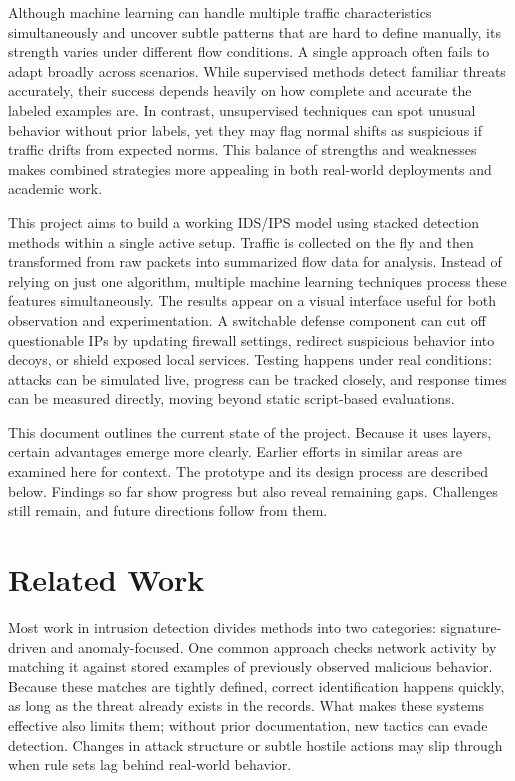 \documentclass[conference]{IEEEtran}
\begin{document}
Although machine learning can handle multiple traffic characteristics simultaneously and uncover subtle patterns that are hard to define manually, its strength varies under different flow conditions. A single approach often fails to adapt broadly across scenarios. While supervised methods detect familiar threats accurately, their success depends heavily on how complete and accurate the labeled examples are. In contrast, unsupervised techniques can spot unusual behavior without prior labels, yet they may flag normal shifts as suspicious if traffic drifts from expected norms. This balance of strengths and weaknesses makes combined strategies more appealing in both real-world deployments and academic work.

This project aims to build a working IDS/IPS model using stacked detection methods within a single active setup. Traffic is collected on the fly and then transformed from raw packets into summarized flow data for analysis. Instead of relying on just one algorithm, multiple machine learning techniques process these features simultaneously. The results appear on a visual interface useful for both observation and experimentation. A switchable defense component can cut off questionable IPs by updating firewall settings, redirect suspicious behavior into decoys, or shield exposed local services. Testing happens under real conditions: attacks can be simulated live, progress can be tracked closely, and response times can be measured directly, moving beyond static script-based evaluations.

This document outlines the current state of the project. Because it uses layers, certain advantages emerge more clearly. Earlier efforts in similar areas are examined here for context. The prototype and its design process are described below. Findings so far show progress but also reveal remaining gaps. Challenges still remain, and future directions follow from them.

\section{Related Work}

Most work in intrusion detection divides methods into two categories: signature-driven and anomaly-focused. One common approach checks network activity by matching it against stored examples of previously observed malicious behavior. Because these matches are tightly defined, correct identification happens quickly, as long as the threat already exists in the records. What makes these systems effective also limits them; without prior documentation, new tactics can evade detection. Changes in attack structure or subtle hostile actions may slip through when rule sets lag behind real-world behavior.
\end{document}
